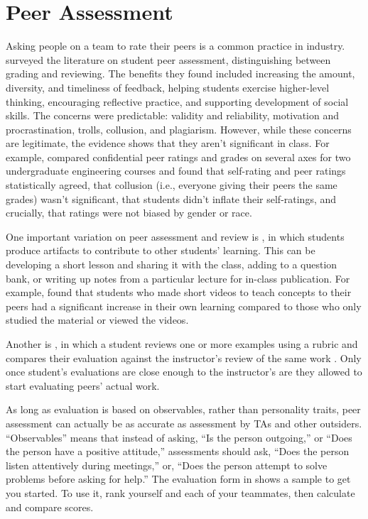 \section{Peer Assessment}\label{s:individual-peer}

Asking people on a team to rate their peers is a common practice in
industry.  \cite{Sond2012} surveyed the literature on student peer
assessment, distinguishing between grading and reviewing.  The
benefits they found included increasing the amount, diversity, and
timeliness of feedback, helping students exercise higher-level
thinking, encouraging reflective practice, and supporting development
of social skills.  The concerns were predictable: validity and
reliability, motivation and procrastination, trolls, collusion, and
plagiarism.  However, while these concerns are legitimate, the
evidence shows that they aren't significant in class.  For example,
\cite{Kauf2000} compared confidential peer ratings and grades on
several axes for two undergraduate engineering courses and found that
self-rating and peer ratings statistically agreed, that collusion
(i.e., everyone giving their peers the same grades) wasn't
significant, that students didn't inflate their self-ratings, and
crucially, that ratings were not biased by gender or race.

One important variation on peer assessment and review is
, in
which students produce artifacts to contribute to other students'
learning.  This can be developing a short lesson and sharing it with
the class, adding to a question bank, or writing up notes from a
particular lecture for in-class publication.  For example,
\cite{Fran2018} found that students who made short videos to teach
concepts to their peers had a significant increase in their own
learning compared to those who only studied the material or viewed the
videos.

Another is , in which a student reviews one or more examples using a
rubric and compares their evaluation against the instructor's review
of the same work \cite{Kulk2013}.  Only once student's evaluations are
close enough to the instructor's are they allowed to start evaluating
peers' actual work.

As long as evaluation is based on observables, rather than personality
traits, peer assessment can actually be as accurate as assessment by
TAs and other outsiders.  ``Observables'' means that instead of
asking, ``Is the person outgoing,'' or ``Does the person have a
positive attitude,'' assessments should ask, ``Does the person listen
attentively during meetings,'' or, ``Does the person attempt to solve
problems before asking for help.''  The evaluation form in
 shows a sample to get you started.  To use it,
rank yourself and each of your teammates, then calculate and compare
scores.

